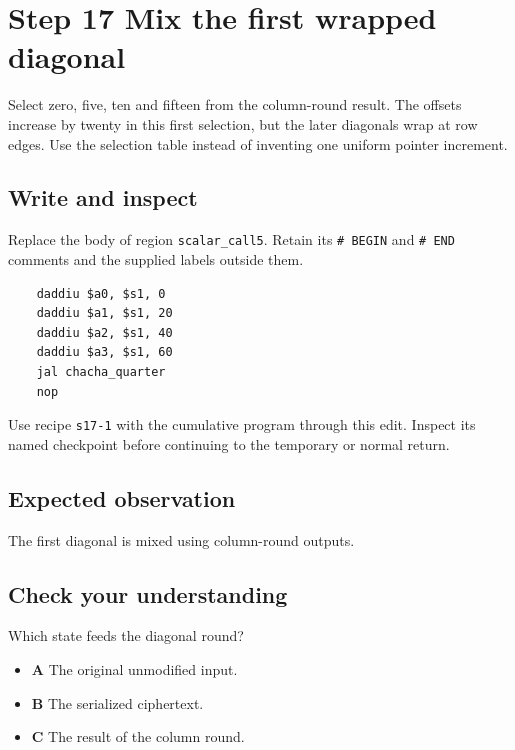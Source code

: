 \section{Step 17 Mix the first wrapped diagonal}\label{chacha-s17}

Select zero, five, ten and fifteen from the column-round result. The offsets increase by twenty in this first selection, but the later diagonals wrap at row edges. Use the selection table instead of inventing one uniform pointer increment.

\subsection{Write and inspect}
Replace the body of region \texttt{scalar\_call5}. Retain its \texttt{\# BEGIN} and \texttt{\# END} comments and the supplied labels outside them.

\begin{verbatim}
    daddiu $a0, $s1, 0
    daddiu $a1, $s1, 20
    daddiu $a2, $s1, 40
    daddiu $a3, $s1, 60
    jal chacha_quarter
    nop
\end{verbatim}

Use recipe \texttt{s17-1} with the cumulative program through this edit. Inspect its named checkpoint before continuing to the temporary or normal return.

\subsection{Expected observation}
The first diagonal is mixed using column-round outputs.

\subsection{Check your understanding}
Which state feeds the diagonal round?

\begin{itemize}
  \item \textbf{A} The original unmodified input.
  \item \textbf{B} The serialized ciphertext.
  \item \textbf{C} The result of the column round.
\end{itemize}
